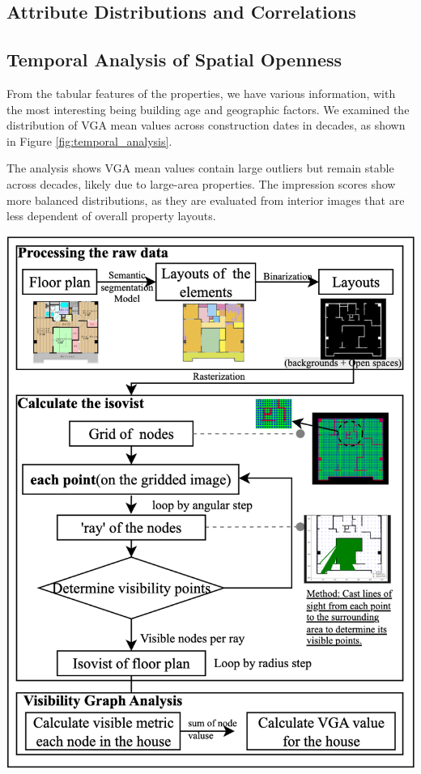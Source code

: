 \documentclass[11pt,a4paper]{article}
\begin{document}
\begin{multicols}{2}
\vspace{1em}

\section{Attribute Distributions and Correlations}

\subsection{Temporal Analysis of Spatial Openness}
From the tabular features of the properties, we have various information, with the most interesting 
being building age and geographic factors. 
We examined the distribution of VGA mean values across construction dates in decades, as shown in 
Figure \ref{fig:temporal_analysis}.

The analysis shows VGA mean values contain large outliers but remain stable across decades, likely due to large-area properties. 
The impression scores show more balanced distributions, as they are evaluated from interior images that are less dependent of overall property layouts.
\begin{center}
    \includegraphics[width=0.95\columnwidth]{plots/vga_process.png}
    \label{fig:madori_processing}
\end{center}


\end{multicols}
\end{document}

